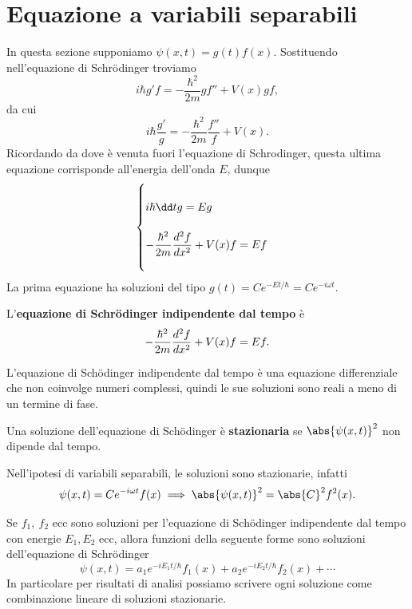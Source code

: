 \section{Equazione a variabili separabili}
In questa sezione supponiamo $\psi(x,t)=g(t)f(x)$. Sostituendo nell'equazione di Schr\"odinger troviamo
\[i\hbar g'f=-\frac{\hbar^2}{2m}gf''+V(x)gf,\]
da cui
\[i\hbar \frac{g'}g=-\frac{\hbar^2}{2m}\frac{f''}f+V(x).\]
Ricordando da dove \`e venuta fuori l'equazione di Schrodinger, questa ultima equazione corrisponde all'energia dell'onda $E$, dunque
\[\begin{cases}
~\\
\displaystyle i\hbar \dd tg=Eg\\\\
\displaystyle-\frac{\hbar^2}{2m}\dds[2]xf+V(x)f=Ef\\~
\end{cases}\]
La prima equazione ha soluzioni del tipo $g(t)=Ce^{-Et/\hbar}=Ce^{-i\omega t}$. 

\begin{definition}
L'\textbf{equazione di Schr\"odinger indipendente dal tempo} \`e
\[-\frac{\hbar^2}{2m}\dds[2]xf+V(x)f=Ef.\]
\end{definition}
\begin{remark}
L'equazione di Sch\"odinger indipendente dal tempo \`e una equazione differenziale che non coinvolge numeri complessi, quindi le sue soluzioni sono reali a meno di un termine di fase.
\end{remark}



\begin{definition}
Una soluzione dell'equazione di Sch\"odinger \`e \textbf{stazionaria} se $\abs{\psi(x,t)}^2$ non dipende dal tempo.
\end{definition}

\begin{remark}
Nell'ipotesi di variabili separabili, le soluzioni sono stazionarie, infatti
\[\psi(x,t)=Ce^{-i\omega t}f(x)\implies \abs{\psi(x,t)}^2=\abs{C}^2f^2(x).\] 
\end{remark}


\begin{remark}
Se $f_1,\ f_2$ ecc sono soluzioni per l'equazione di Sch\"odinger indipendente dal tempo con energie $E_1, E_2$ ecc, allora funzioni della seguente forme sono soluzioni dell'equazione di Schr\"odinger
\[\psi(x,t)=a_1e^{-iE_1 t/\hbar}f_1(x)+a_2e^{-iE_2 t/\hbar}f_2(x)+\cdots\]
In particolare per risultati di analisi possiamo scrivere ogni soluzione come combinazione lineare di soluzioni stazionarie.
\end{remark}




